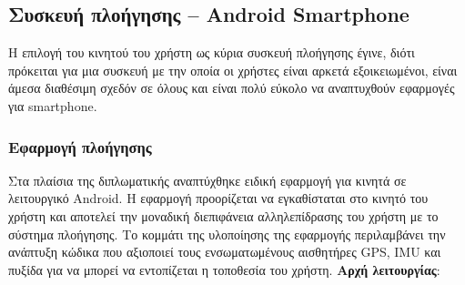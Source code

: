 \subsection{Συσκευή πλοήγησης – Android Smartphone}
Η επιλογή του κινητού του χρήστη ως κύρια συσκευή πλοήγησης έγινε, διότι πρόκειται για μια συσκευή με την οποία οι χρήστες είναι αρκετά εξοικειωμένοι, είναι άμεσα διαθέσιμη σχεδόν σε όλους και είναι πολύ εύκολο να αναπτυχθούν εφαρμογές για smartphone.

\subsubsection{Εφαρμογή πλοήγησης}
Στα πλαίσια της διπλωματικής αναπτύχθηκε ειδική εφαρμογή για κινητά σε λειτουργικό Android. Η εφαρμογή προορίζεται να εγκαθίσταται στο κινητό του χρήστη και αποτελεί την μοναδική διεπιφάνεια αλληλεπίδρασης του χρήστη με το σύστημα πλοήγησης. Το κομμάτι της υλοποίησης της εφαρμογής περιλαμβάνει την ανάπτυξη κώδικα που αξιοποιεί τους ενσωματωμένους αισθητήρες GPS, IMU και πυξίδα για να μπορεί να εντοπίζεται η τοποθεσία του χρήστη.
\newline
\newline
\textbf{Αρχή λειτουργίας}:

